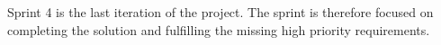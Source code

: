Sprint 4 is the last iteration of the project.
The sprint is therefore focused on completing the solution and fulfilling the missing high priority requirements.
